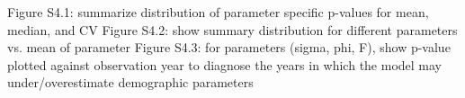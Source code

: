 \documentclass[12pt, oneside, titlepage]{article}   	%
\begin{document}
Figure S4.1: summarize distribution of parameter specific p-values for mean, median, and CV
Figure S4.2: show summary distribution for different parameters vs. mean of parameter
Figure S4.3: for parameters (sigma, phi, F), show p-value plotted against observation year to diagnose the years in which the model may under/overestimate demographic parameters

\clearpage

\end{document}
